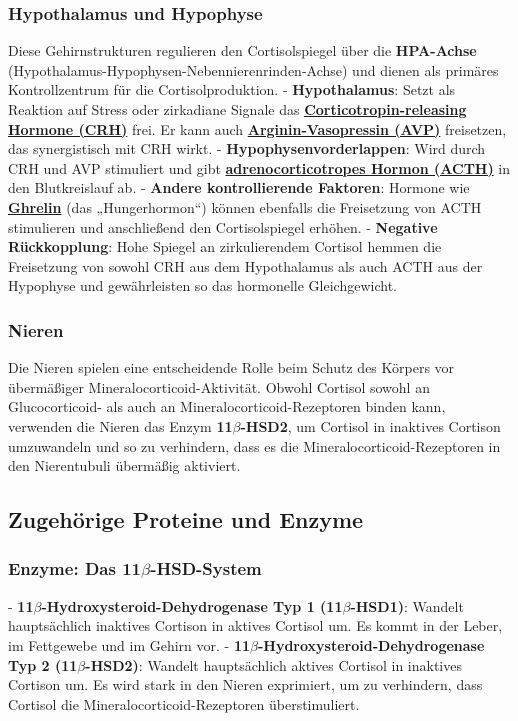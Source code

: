 \documentclass{article}
\begin{document}
\subsubsection{Hypothalamus und Hypophyse}
Diese Gehirnstrukturen regulieren den Cortisolspiegel über die \textbf{HPA-Achse} (Hypothalamus-Hypophysen-Nebennierenrinden-Achse) und dienen als primäres Kontrollzentrum für die Cortisolproduktion.
- \textbf{Hypothalamus}: Setzt als Reaktion auf Stress oder zirkadiane Signale das \textbf{\href{https://www.proteinatlas.org/ENSG00000147571-CRH}{Corticotropin-releasing Hormone (CRH)}} frei. Er kann auch \textbf{\href{https://www.proteinatlas.org/ENSG00000101200-AVP}{Arginin-Vasopressin (AVP)}} freisetzen, das synergistisch mit CRH wirkt.
- \textbf{Hypophysenvorderlappen}: Wird durch CRH und AVP stimuliert und gibt \textbf{\href{https://www.proteinatlas.org/ENSG00000115138-POMC}{adrenocorticotropes Hormon (ACTH)}} in den Blutkreislauf ab.
- \textbf{Andere kontrollierende Faktoren}: Hormone wie \textbf{\href{https://www.proteinatlas.org/ENSG00000157017-GHRL}{Ghrelin}} (das „Hungerhormon“) können ebenfalls die Freisetzung von ACTH stimulieren und anschließend den Cortisolspiegel erhöhen.
- \textbf{Negative Rückkopplung}: Hohe Spiegel an zirkulierendem Cortisol hemmen die Freisetzung von sowohl CRH aus dem Hypothalamus als auch ACTH aus der Hypophyse und gewährleisten so das hormonelle Gleichgewicht.

\subsubsection{Nieren}
Die Nieren spielen eine entscheidende Rolle beim Schutz des Körpers vor übermäßiger Mineralocorticoid-Aktivität. Obwohl Cortisol sowohl an Glucocorticoid- als auch an Mineralocorticoid-Rezeptoren binden kann, verwenden die Nieren das Enzym \textbf{11\texorpdfstring{$\beta$}{beta}-HSD2}, um Cortisol in inaktives Cortison umzuwandeln und so zu verhindern, dass es die Mineralocorticoid-Rezeptoren in den Nierentubuli übermäßig aktiviert.

\hrulefill

\subsection{Zugehörige Proteine und Enzyme}

\subsubsection{Enzyme: Das 11\texorpdfstring{$\beta$}{beta}-HSD-System}
- \textbf{11\texorpdfstring{$\beta$}{beta}-Hydroxysteroid-Dehydrogenase Typ 1 (11\texorpdfstring{$\beta$}{beta}-HSD1)}: Wandelt hauptsächlich inaktives Cortison in aktives Cortisol um. Es kommt in der Leber, im Fettgewebe und im Gehirn vor.
- \textbf{11\texorpdfstring{$\beta$}{beta}-Hydroxysteroid-Dehydrogenase Typ 2 (11\texorpdfstring{$\beta$}{beta}-HSD2)}: Wandelt hauptsächlich aktives Cortisol in inaktives Cortison um. Es wird stark in den Nieren exprimiert, um zu verhindern, dass Cortisol die Mineralocorticoid-Rezeptoren überstimuliert.
\end{document}
